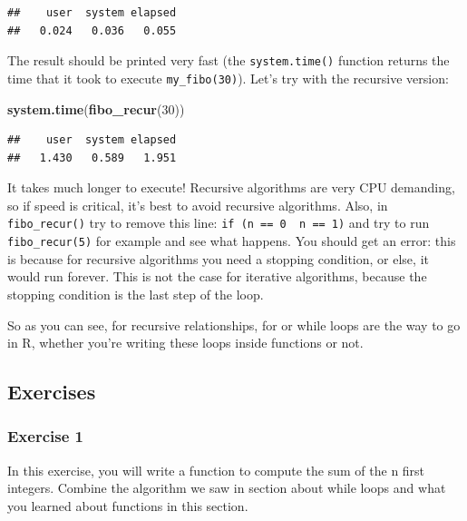 \documentclass[]{gitbook}
\newenvironment{Shaded}{\begin{snugshade}}{\end{snugshade}}
\newcommand{\DecValTok}[1]{\textcolor[rgb]{0.00,0.00,0.81}{#1}}
\newcommand{\KeywordTok}[1]{\textcolor[rgb]{0.13,0.29,0.53}{\textbf{#1}}}
\newcommand{\NormalTok}[1]{#1}
\begin{document}
\begin{verbatim}
##    user  system elapsed 
##   0.024   0.036   0.055
\end{verbatim}

The result should be printed very fast (the \texttt{system.time()} function returns the time that it took
to execute \texttt{my\_fibo(30)}). Let's try with the recursive version:

\begin{Shaded}
\begin{Highlighting}[]
\KeywordTok{system.time}\NormalTok{(}\KeywordTok{fibo_recur}\NormalTok{(}\DecValTok{30}\NormalTok{))}
\end{Highlighting}
\end{Shaded}

\begin{verbatim}
##    user  system elapsed 
##   1.430   0.589   1.951
\end{verbatim}

It takes much longer to execute! Recursive algorithms are very CPU demanding, so if speed is
critical, it's best to avoid recursive algorithms. Also, in \texttt{fibo\_recur()} try to remove this line:
\texttt{if\ (n\ ==\ 0\ \textbar{}\textbar{}\ n\ ==\ 1)} and try to run \texttt{fibo\_recur(5)} for example and see what happens. You should
get an error: this is because for recursive algorithms you need a stopping condition, or else,
it would run forever. This is not the case for iterative algorithms, because the stopping
condition is the last step of the loop.

So as you can see, for recursive relationships, for or while loops are the way to go in R, whether
you're writing these loops inside functions or not.

\hypertarget{exercises-4}{%
\subsection{Exercises}\label{exercises-4}}

\hypertarget{exercise-1-4}{%
\subsubsection*{Exercise 1}\label{exercise-1-4}}

In this exercise, you will write a function to compute the sum of the n first integers. Combine the
algorithm we saw in section about while loops and what you learned about functions
in this section.
\end{document}
